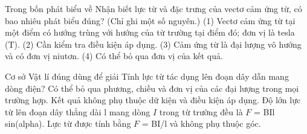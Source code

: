 \begin{ex}
Trong bốn phát biểu về Nhận biết lực từ và đặc trưng của vectơ cảm ứng từ, có bao nhiêu phát biểu đúng? (Chỉ ghi một số nguyên.) (1) Vectơ cảm ứng từ tại một điểm có hướng trùng với hướng của từ trường tại điểm đó; đơn vị là tesla (T). (2) Cần kiểm tra điều kiện áp dụng. (3) Cảm ứng từ là đại lượng vô hướng và có đơn vị niutơn. (4) Có thể bỏ qua đơn vị của kết quả.
\end{ex}

\begin{ex}
Cơ sở Vật lí đúng dùng để giải Tính lực từ tác dụng lên đoạn dây dẫn mang dòng điện?
\choice
{Có thể bỏ qua phương, chiều và đơn vị của các đại lượng trong mọi trường hợp.}
{Kết quả không phụ thuộc dữ kiện và điều kiện áp dụng.}
{\True Độ lớn lực từ lên đoạn dây thẳng dài l mang dòng $I$ trong từ trường đều là $F$ = BIl sin(alpha).}
{Lực từ được tính bằng $F$ = BI/l và không phụ thuộc góc.}
\end{ex}

